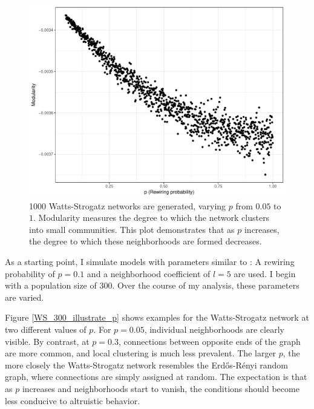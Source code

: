 \documentclass{JASSS}
\begin{document}
\begin{figure}
	\centering
	\includegraphics[width=\linewidth]{./figures/illustrateWS_p_modularity.pdf}
	\caption{1000 Watts-Strogatz networks are generated, varying $p$ from $0.05$ to $1$. Modularity measures the degree to which the network clusters into small communities. This plot demonstrates that as $p$ increases, the degree to which these neighborhoods are formed decreases.}
	\label{illustrateWS_p_modularity}
\end{figure}

As a starting point, I simulate models with parameters similar to \cite{Peleteiro2014}: A rewiring probability of $p=0.1$ and a neighborhood coefficient of $l=5$ are used. I begin with a population size of 300. Over the course of my analysis, these parameters are varied.

Figure \ref{WS_300_illustrate_p} shows examples for the Watts-Strogatz network at two different values of $p$. For $p = 0.05$, individual neighborhoods are clearly visible. By contrast, at $p = 0.3$, connections between opposite ends of the graph are more common, and local clustering is much less prevalent. The larger $p$, the more closely the Watts-Strogatz network resembles the Erd\H{o}s-R\'{e}nyi random graph, where connections are simply assigned at random. The expectation is that as $p$ increases and neighborhoods start to vanish, the conditions should become less conducive to altruistic behavior.
\end{document}
